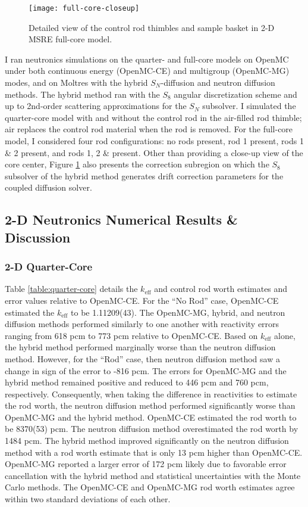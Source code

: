 \begin{figure}[htb!]
  \centering
  \texttt{[image: full-core-closeup]}
  \caption{Detailed view of the control rod thimbles and sample basket in 2-D \gls{MSRE} full-core
    model.}
  \label{fig:full-geom-closeup}
\end{figure}

I ran neutronics simulations on the quarter- and full-core models on OpenMC under both continuous
energy (OpenMC-CE) and multigroup (OpenMC-MG) modes, and on Moltres with the hybrid $S_N$-diffusion
and neutron diffusion methods. The hybrid method ran with the $S_8$ angular discretization scheme
and up to 2nd-order scattering approximations for the $S_N$ subsolver. I simulated the
quarter-core model with and without the control rod in the air-filled rod thimble; air replaces the
control rod material when the rod is removed. For the full-core model, I considered four rod
configurations: no rods present, rod 1 present, rods 1 \& 2 present, and rods 1, 2 \& present.
Other than providing a close-up view of the core center, Figure \ref{fig:full-geom-closeup} also
presents the correction subregion on which the $S_8$ subsolver of the hybrid method generates
drift correction parameters for the coupled diffusion solver.

\FloatBarrier

\subsection{2-D Neutronics Numerical Results \& Discussion} \label{sec:2d-nts-results}

\subsubsection{2-D Quarter-Core}

Table \ref{table:quarter-core} details the $k_\text{eff}$ and control rod worth estimates and error
values relative to OpenMC-CE. For the ``No Rod'' case, OpenMC-CE estimated the $k_\text{eff}$ to be
1.11209(43). The OpenMC-MG, hybrid, and neutron diffusion methods performed
similarly to one another with reactivity errors ranging from 618 pcm to 773 pcm relative to
OpenMC-CE. Based on $k_\text{eff}$ alone, the hybrid method performed marginally worse than the
neutron diffusion method. However, for the ``Rod'' case, then neutron diffusion method saw a
change in sign of the error to -816 pcm. The errors for OpenMC-MG and the hybrid method
remained positive and reduced to 446 pcm and 760 pcm, respectively. Consequently, when taking the
difference in reactivities to estimate the rod worth, the neutron diffusion method performed
significantly worse than OpenMC-MG and the hybrid method. OpenMC-CE estimated the rod worth to be
8370(53) pcm. The neutron diffusion method overestimated the rod worth by 1484 pcm. The hybrid
method improved significantly on the neutron diffusion method with a rod worth estimate that is
only 13 pcm
higher than OpenMC-CE. OpenMC-MG reported a larger error of 172 pcm likely due to favorable error
cancellation with the hybrid method and statistical uncertainties with the Monte Carlo methods.
The OpenMC-CE and OpenMC-MG rod worth estimates agree within two standard deviations of each other.


